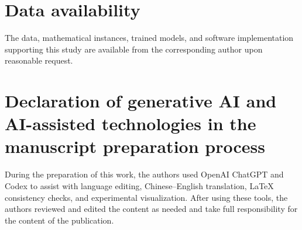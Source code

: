 \documentclass[final,5p,times,twocolumn]{elsarticle}
\begin{document}
\section*{Data availability}
The data, mathematical instances, trained models, and software implementation supporting this study are available from the corresponding author upon reasonable request.

\section*{Declaration of generative AI and AI-assisted technologies in the manuscript preparation process}
During the preparation of this work, the authors used OpenAI ChatGPT and Codex to assist with language editing, Chinese--English translation, LaTeX consistency checks, and experimental visualization. After using these tools, the authors reviewed and edited the content as needed and take full responsibility for the content of the publication.
\end{document}
